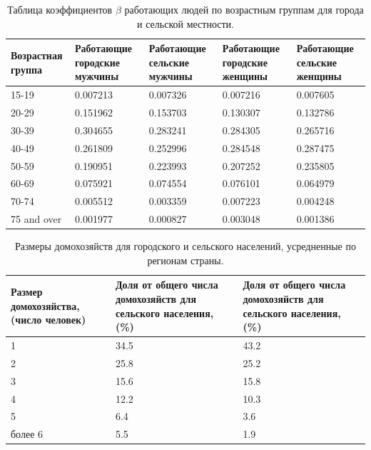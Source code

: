 \documentclass[14pt,a4paper]{article}
\begin{document}
\begin{table}[h!]
	\centering
	\setlength{\arrayrulewidth}{1pt}
	\renewcommand{\arraystretch}{1.5}
	\caption{Таблица коэффициентов $\beta$  работающих людей по возрастным группам для города и сельской местности.}
	\begin{tabularx}{\linewidth}{|X|X|X|X|X|}
		\hline
		{Возрастная группа} &
		{Работающие городские мужчины} &
		{Работающие сельские мужчины}  & 
		{Работающие городские женщины} &
		{Работающие сельские женщины}  \\ \hline
		15-19 & 0.007213 & 0.007326 & 0.007216 & 0.007605 \\ \hline
		20-29 & 0.151962 & 0.153703 & 0.130307 & 0.132786 \\ \hline
		30-39 & 0.304655 & 0.283241 & 0.284305 & 0.265716 \\ \hline
		40-49 & 0.261809 & 0.252996 & 0.284548 & 0.287475 \\ \hline
		50-59 & 0.190951 & 0.223993 & 0.207252 & 0.235805 \\ \hline
		60-69 & 0.075921 & 0.074554 & 0.076101 & 0.064979 \\ \hline
		70-74 & 0.005512 & 0.003359 & 0.007223 & 0.004248 \\ \hline
		75 and over & 0.001977 & 0.000827 & 0.003048 & 0.001386 \\ \hline
	\end{tabularx}
	\label{coeffааа}
\end{table}



\begin{table}[h!]
	\centering
	\setlength{\arrayrulewidth}{1pt}
	\renewcommand{\arraystretch}{1.5}
		\caption{Размеры домохозяйств для городского и сельского населений, усредненные по регионам страны.}
	\begin{tabularx}{\linewidth}{|X|X|X|}
		
		\hline
		{Размер домохозяйства, (число человек)} &
		{Доля от общего числа домохозяйств для сельского населения, (\%)} &
		{Доля от общего числа домохозяйств для сельского населения, (\%)} \\
		\hline
		1 & 34.5 & 43.2  \\
		\hline
		2 & 25.8 & 25.2  \\
		\hline
		3 & 15.6 & 15.8  \\
		\hline
		4 & 12.2 & 10.3  \\
		\hline
		5 & 6.4 & 3.6  \\
		\hline
		более 6 & 5.5 & 1.9  \\
		\hline
	\end{tabularx}
	\label{tab: 111}
\end{table}
\end{document}
